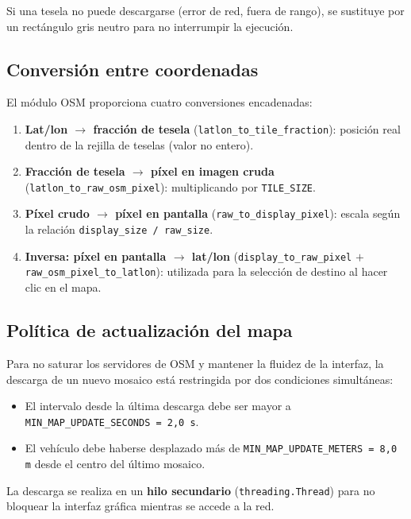 \documentclass[10pt]{article}
\begin{document}
Si una tesela no puede descargarse (error de red, fuera de rango), se sustituye por un rectángulo gris neutro para no interrumpir la ejecución.

\subsection{Conversión entre coordenadas}

El módulo OSM proporciona cuatro conversiones encadenadas:

\begin{enumerate}[leftmargin=1.6em]
    \item \textbf{Lat/lon $\to$ fracción de tesela} (\texttt{latlon\_to\_tile\_fraction}): posición real dentro de la rejilla de teselas (valor no entero).
    \item \textbf{Fracción de tesela $\to$ píxel en imagen cruda} (\texttt{latlon\_to\_raw\_osm\_pixel}): multiplicando por \texttt{TILE\_SIZE}.
    \item \textbf{Píxel crudo $\to$ píxel en pantalla} (\texttt{raw\_to\_display\_pixel}): escala según la relación \texttt{display\_size / raw\_size}.
    \item \textbf{Inversa: píxel en pantalla $\to$ lat/lon} (\texttt{display\_to\_raw\_pixel} $+$ \texttt{raw\_osm\_pixel\_to\_latlon}): utilizada para la selección de destino al hacer clic en el mapa.
\end{enumerate}

\subsection{Política de actualización del mapa}

Para no saturar los servidores de OSM y mantener la fluidez de la interfaz, la descarga de un nuevo mosaico está restringida por dos condiciones simultáneas:

\begin{itemize}[leftmargin=1.2em]
    \item El intervalo desde la última descarga debe ser mayor a \texttt{MIN\_MAP\_UPDATE\_SECONDS = 2{,}0 s}.
    \item El vehículo debe haberse desplazado más de \texttt{MIN\_MAP\_UPDATE\_METERS = 8{,}0 m} desde el centro del último mosaico.
\end{itemize}

La descarga se realiza en un \textbf{hilo secundario} (\texttt{threading.Thread}) para no bloquear la interfaz gráfica mientras se accede a la red.
\end{document}
